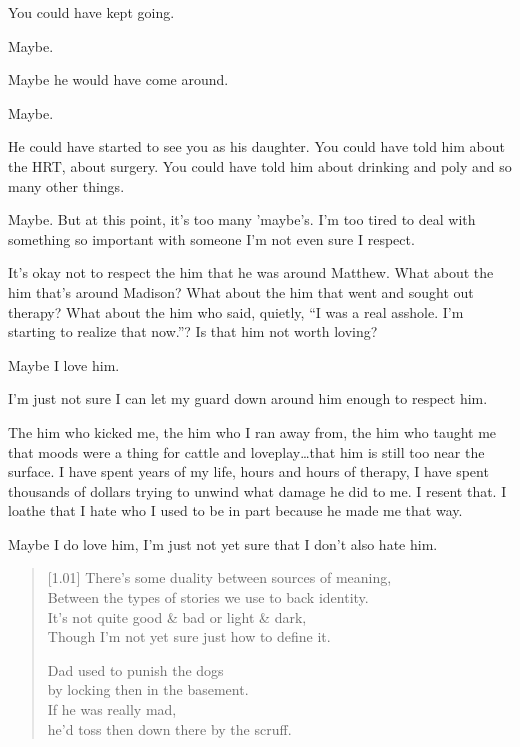 \begin{paracol}{2}
\begin{leftcolumn}
\begin{ally}
You could have kept going.
\end{ally}
Maybe.

\begin{ally}
Maybe he would have come around.
\end{ally}
Maybe.

\begin{ally}
He could have started to see you as his daughter. You could have told him about the HRT, about surgery. You could have told him about drinking and poly and so many other things.
\end{ally}
Maybe. But at this point, it's too many 'maybe's. I'm too tired to deal with something so important with someone I'm not even sure I respect.

\begin{ally}
It's okay not to respect the him that he was around Matthew. What about the him that's around Madison? What about the him that went and sought out therapy? What about the him who said, quietly, ``I was a real asshole. I'm starting to realize that now.''? Is that him not worth loving?
\end{ally}
Maybe I love him.

I'm just not sure I can let my guard down around him enough to respect him.

The him who kicked me, the him who I ran away from, the him who taught me that moods were a thing for cattle and loveplay\ldots{}that him is still too near the surface. I have spent years of my life, hours and hours of therapy, I have spent thousands of dollars trying to unwind what damage he did to me. I resent that. I loathe that I hate who I used to be in part because he made me that way.

Maybe I do love him, I'm just not yet sure that I don't also hate him.
\newpage

\begin{verse}[1.01\textwidth]
  There's some duality between sources of meaning,\\
  \vin Between the types of stories we use to back identity.\\
  It's not quite good \& bad or light \& dark,\\
  \vin Though I'm not yet sure just how to define it.

  Dad used to punish the dogs\\
  \vin by locking then in the basement.\\
  If he was really mad,\\
  \vin he'd toss then down there by the scruff.


\end{verse}
\end{leftcolumn}
\end{paracol}
